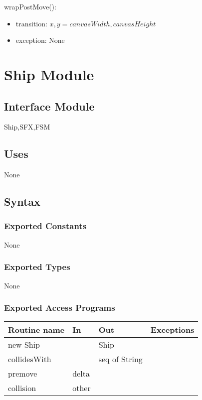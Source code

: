 \documentclass[12pt]{article}
\begin{document}
\noindent wrapPostMove():
\begin{itemize}
\item transition: $x, y = canvasWidth, canvasHeight$
\item exception: None
\end{itemize}

\newpage








\section* {Ship Module}

\subsection*{Interface Module}

Ship,SFX,FSM

\subsection* {Uses}

None

\subsection* {Syntax}

\subsubsection* {Exported Constants}

None

\subsubsection* {Exported Types}

None 

\subsubsection* {Exported Access Programs}

\begin{tabular}{| l | l | l | p{5cm} |}
\hline
\textbf{Routine name} & \textbf{In} & \textbf{Out} & \textbf{Exceptions}\\
\hline
new Ship & ~ & Ship  & ~\\
\hline
collidesWith & ~ & seq of String & ~\\
\hline
premove & delta & ~  & ~\\
\hline
collision & other & ~ & ~ \\
\hline

\end{tabular}
\end{document}

